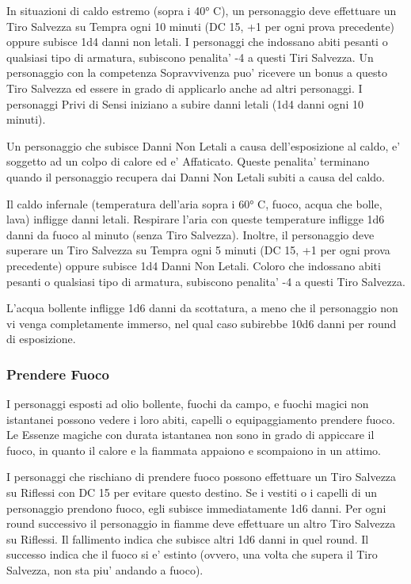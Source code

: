 \documentclass[a4paper,11pt,twoside,openany]{book}
\begin{document}
{In situazioni di caldo estremo (sopra i 40° C), un personaggio deve effettuare un Tiro Salvezza su Tempra ogni 10 minuti (DC 15, +1 per ogni prova precedente) oppure subisce 1d4 danni non letali. I personaggi che indossano abiti pesanti o qualsiasi tipo di armatura, subiscono penalita' -4 a questi Tiri Salvezza. Un personaggio con la competenza Sopravvivenza puo' ricevere un bonus a questo Tiro Salvezza ed essere in grado di applicarlo anche ad altri personaggi. I personaggi Privi di Sensi iniziano a subire danni letali (1d4 danni ogni 10 minuti).

Un personaggio che subisce Danni Non Letali a causa dell'esposizione al caldo, e' soggetto ad un colpo di calore ed e' Affaticato. Queste penalita' terminano quando il personaggio recupera dai Danni Non Letali subiti a causa del caldo.

Il caldo infernale (temperatura dell'aria sopra i 60° C, fuoco, acqua che bolle, lava) infligge danni letali. Respirare l'aria con queste temperature infligge 1d6 danni da fuoco al minuto (senza Tiro Salvezza). 
Inoltre, il personaggio deve superare un Tiro Salvezza su Tempra ogni 5 minuti (DC 15, +1 per ogni prova precedente) oppure subisce 1d4 Danni Non Letali. Coloro che indossano abiti pesanti o qualsiasi tipo di armatura, subiscono penalita' -4 a questi Tiro Salvezza.

L'acqua bollente infligge 1d6 danni da scottatura, a meno che il personaggio non vi venga completamente immerso, nel qual caso subirebbe 10d6 danni per round di esposizione.

\subsubsection{Prendere Fuoco}

\label{prendere-fuoco}

I personaggi esposti ad olio bollente, fuochi da campo, e fuochi magici non istantanei possono vedere i loro abiti, capelli o equipaggiamento prendere fuoco. Le Essenze magiche con durata istantanea non sono in grado di appiccare il fuoco, in quanto il calore e la fiammata appaiono e scompaiono in un attimo.

I personaggi che rischiano di prendere fuoco possono effettuare un Tiro Salvezza su Riflessi con DC 15 per evitare questo destino. Se i vestiti o i capelli di un personaggio prendono fuoco, egli subisce immediatamente 1d6 danni. Per ogni round successivo il personaggio in fiamme deve effettuare un altro Tiro Salvezza su Riflessi. Il fallimento indica che subisce altri 1d6 danni in quel round. Il successo indica che il fuoco si e' estinto (ovvero, una volta che supera il Tiro Salvezza, non sta piu' andando a fuoco).

}
\end{document}
